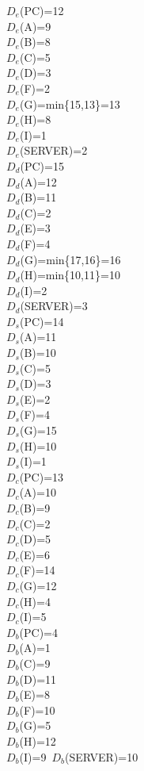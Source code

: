 \documentclass{article}
\begin{document}
{{{$D_e$(PC)=12\\
$D_e$(A)=9\\
$D_e$(B)=8\\
$D_e$(C)=5\\
$D_e$(D)=3\\
$D_e$(F)=2\\
$D_e$(G)=min\{15,13\}=13\\
$D_e$(H)=8\\
$D_e$(I)=1\\
$D_e$(SERVER)=2\\

$D_d$(PC)=15\\
$D_d$(A)=12\\
$D_d$(B)=11\\
$D_d$(C)=2\\
$D_d$(E)=3\\
$D_d$(F)=4\\
$D_d$(G)=min\{17,16\}=16\\
$D_d$(H)=min\{10,11\}=10\\
$D_d$(I)=2\\
$D_d$(SERVER)=3\\

$D_s$(PC)=14\\
$D_s$(A)=11\\
$D_s$(B)=10\\
$D_s$(C)=5\\
$D_s$(D)=3\\
$D_s$(E)=2\\
$D_s$(F)=4\\
$D_s$(G)=15\\
$D_s$(H)=10\\
$D_s$(I)=1\\

$D_c$(PC)=13\\
$D_c$(A)=10\\
$D_c$(B)=9\\
$D_c$(C)=2\\
$D_c$(D)=5\\
$D_c$(E)=6\\
$D_c$(F)=14\\
$D_c$(G)=12\\
$D_c$(H)=4\\
$D_c$(I)=5\\

$D_b$(PC)=4\\
$D_b$(A)=1\\
$D_b$(C)=9\\
$D_b$(D)=11\\
$D_b$(E)=8\\
$D_b$(F)=10\\
$D_b$(G)=5\\
$D_b$(H)=12\\
$D_b$(I)=9\
$D_b$(SERVER)=10\\

}}}
\end{document}
